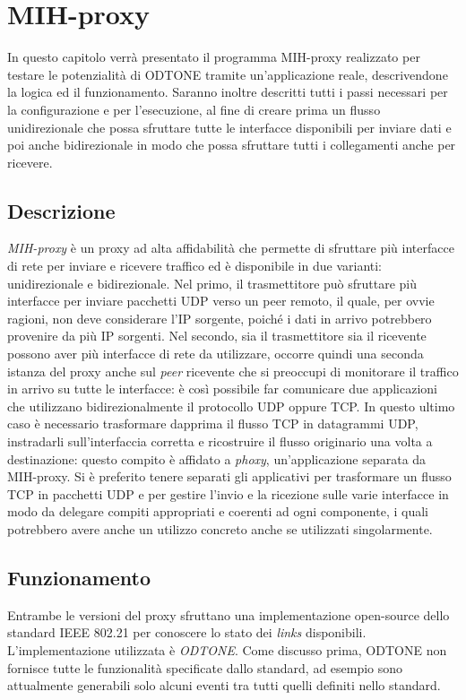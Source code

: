 \chapter{MIH-proxy}
In questo capitolo verrà presentato il programma MIH-proxy realizzato per testare le potenzialità di ODTONE tramite un'applicazione reale, descrivendone la logica ed il funzionamento. Saranno inoltre descritti tutti i passi necessari per la configurazione e per l'esecuzione, al fine di creare prima un flusso unidirezionale che possa sfruttare tutte le interfacce disponibili per inviare dati e poi anche bidirezionale in modo che possa sfruttare tutti i collegamenti anche per ricevere.

\section{Descrizione}
{\em MIH-proxy} è un proxy ad alta affidabilità che permette di sfruttare più interfacce di rete per inviare e ricevere traffico ed è disponibile in due varianti: unidirezionale e bidirezionale. Nel primo, il trasmettitore può sfruttare più interfacce per inviare pacchetti UDP verso un peer remoto, il quale, per ovvie ragioni, non deve considerare l'IP sorgente, poiché i dati in arrivo potrebbero provenire da più IP sorgenti. Nel secondo, sia il trasmettitore sia il ricevente possono aver più interfacce di rete da utilizzare, occorre quindi una seconda istanza del proxy anche sul {\em peer} ricevente che si preoccupi di monitorare il traffico in arrivo su tutte le interfacce: è così possibile far comunicare due applicazioni che utilizzano bidirezionalmente il protocollo UDP oppure TCP. In questo ultimo caso è necessario trasformare dapprima il flusso TCP in datagrammi UDP, instradarli sull'interfaccia corretta e ricostruire il flusso originario una volta a destinazione: questo compito è affidato a {\em phoxy}, un'applicazione separata da MIH-proxy. Si è preferito tenere separati gli applicativi per trasformare un flusso TCP in pacchetti UDP e per gestire l'invio e la ricezione sulle varie interfacce in modo da delegare compiti appropriati e coerenti ad ogni componente, i quali potrebbero avere anche un utilizzo concreto anche se utilizzati singolarmente.

\section{Funzionamento}
Entrambe le versioni del proxy sfruttano una implementazione open-source dello standard IEEE 802.21 per conoscere lo stato dei {\em links} disponibili. L'implementazione utilizzata è {\em ODTONE}\cite{odtone}. Come discusso prima, ODTONE non fornisce tutte le funzionalità specificate dallo standard, ad esempio sono attualmente generabili solo alcuni eventi tra tutti quelli definiti nello standard.\\

